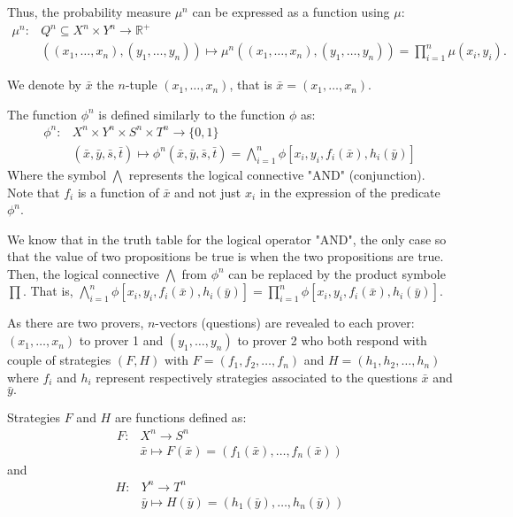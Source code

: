 Thus, the probability measure $\mu^n$ can be expressed as a function using $\mu$: 
 \begin{align*}
\mu^n:  & Q^n \subseteq X^n \times Y^n  \longrightarrow \mathbb{R}^+ \\
  & ((x_1,\ldots, x_n), (y_1,\ldots, y_n)) \longmapsto \mu^n((x_1,\ldots, x_n), (y_1,\ldots, y_n))=\prod_{i=1}^n  \mu (x_i, y_i). 
 \end{align*}
 
We denote by  $\bar{x}$ the $n$-tuple $(x_1,\ldots, x_n)$, that is $\bar{x}=(x_1,\ldots, x_n)$. 

The function $\phi^n$ is defined similarly to the function $ \phi$ as:
\begin{align*}
\phi^n: & X^n \times Y^n \times S^n \times T^n  \longrightarrow  \{0,1\}\\ 
& (\bar{x}, \bar{y},\bar{s}, \bar{t})  \longmapsto  \phi^n(\bar{x}, \bar{y},\bar{s}, \bar{t}) = \bigwedge\limits_{i=1}^n \phi [x_i,y_i, f_i(\bar{x}), h_i(\bar{y})]
\end{align*}
Where the symbol $\bigwedge$ represents the logical connective "AND" (conjunction).
Note that $f_i$ is a function of $\bar{x}$ and not just $x_i$  in the expression of the predicate $\phi^n$.

We know that in the truth table for the logical operator "AND", the only case so that the value of two propositions be true is when the two propositions are true. Then, the logical connective $\bigwedge$ from $\phi^n$ can be replaced by the product symbole $\prod.$ That is,  $\bigwedge\limits_{i=1}^n \phi [x_i,y_i, f_i(\bar{x}), h_i(\bar{y})]=\prod\limits_{i=1}^n  \phi [x_i,y_i, f_i(\bar{x}), h_i(\bar{y})].$

As there are two provers, $n$-vectors (questions) are revealed to each prover:  $(x_1, \ldots , x_n)$ to prover 1 and  $(y_1, \ldots , y_n)$ to prover 2 who both respond with  couple of strategies $(F,H)$ with $F=(f_1, f_2, \ldots, f_n)$ and $H=(h_1, h_2, \ldots, h_n)$ where $f_i$ and $h_i$ represent respectively strategies associated to the questions $\bar{x}$ and $\bar{y}.$

Strategies $F$ and $H$ are functions defined as:
 \begin{align*}
 F: & X^n \longrightarrow S^n\\
 &  \bar{x} \longmapsto F(\bar{x})=(f_1(\bar{x}), \ldots , f_n(\bar{x})) \end{align*}  and 
 \begin{align*} 
 H: & Y^n \longrightarrow T^n\\
 & \bar{y} \longmapsto H(\bar{y})=(h_1(\bar{y}), \ldots , h_n(\bar{y}))
 \end{align*}

